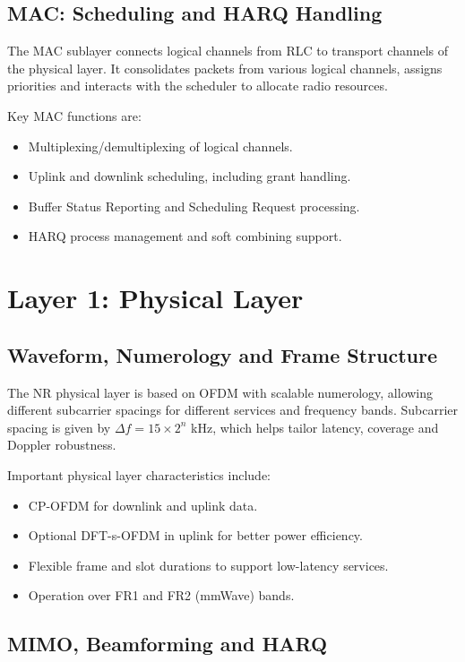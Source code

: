 \documentclass[12pt,a4paper]{article}
\begin{document}
\subsection{MAC: Scheduling and HARQ Handling}

The MAC sublayer connects logical channels from RLC to transport channels of the physical layer. It consolidates packets from various logical channels, assigns priorities and interacts with the scheduler to allocate radio resources. 

Key MAC functions are: 
\begin{itemize}
  \item Multiplexing/demultiplexing of logical channels.
  \item Uplink and downlink scheduling, including grant handling.
  \item Buffer Status Reporting and Scheduling Request processing.
  \item HARQ process management and soft combining support.
\end{itemize}

\section{Layer 1: Physical Layer}

\subsection{Waveform, Numerology and Frame Structure}

The NR physical layer is based on OFDM with scalable numerology, allowing different subcarrier spacings for different services and frequency bands. Subcarrier spacing is given by \(\Delta f = 15 \times 2^n\) kHz, which helps tailor latency, coverage and Doppler robustness. 

Important physical layer characteristics include: 
\begin{itemize}
  \item CP-OFDM for downlink and uplink data.
  \item Optional DFT-s-OFDM in uplink for better power efficiency.
  \item Flexible frame and slot durations to support low-latency services.
  \item Operation over FR1 and FR2 (mmWave) bands.
\end{itemize}

\subsection{MIMO, Beamforming and HARQ}
\end{document}

